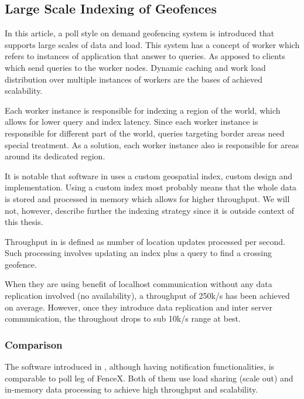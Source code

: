 \documentclass[a4]{report}
\begin{document}
    \subsection{Large Scale Indexing of Geofences}
    In this article, a poll style on demand geofencing system is introduced that supports large scales
    of data and load.
    This system has a concept of worker which refers to instances of application that answer to queries.
    As apposed to clients which send queries to the worker nodes.
    Dynamic caching and work load distribution over multiple instances of workers are the bases of achieved
    scalability.

    Each worker instance is responsible for indexing a region of the world, which allows for lower query and index latency.
    Since each worker instance is responsible for different part of the world, queries targeting border areas need
    special treatment.
    As a solution, each worker instance also is responsible for areas around its dedicated region.

    It is notable that software in \cite{Cirillo_Jacobs_Martin_Szczytowski_2014} uses a custom geospatial index,
    custom design and implementation.
    Using a custom index most probably means that the whole data is stored and processed in memory which allows for higher throughput.
    We will not, however, describe further the indexing strategy since it is outside context of this thesis.

    Throughput in \cite{Cirillo_Jacobs_Martin_Szczytowski_2014} is defined as number of location updates processed per second.
    Such processing involves updating an index plus a query to find a crossing geofence.

    When they are using benefit of localhost communication without any data replication involved (no availability), a
    throughput of 250k/s has been achieved on average.
    However, once they introduce data replication and inter server communication, the throughout drops to sub 10k/s
    range at best.

    \subsubsection{Comparison}
    The software introduced in \cite{Cirillo_Jacobs_Martin_Szczytowski_2014}, although having notification
    functionalities, is comparable to poll leg of FenceX.
    Both of them use load sharing (scale out) and in-memory data processing to achieve high throughput and
    scalability.
\end{document}
